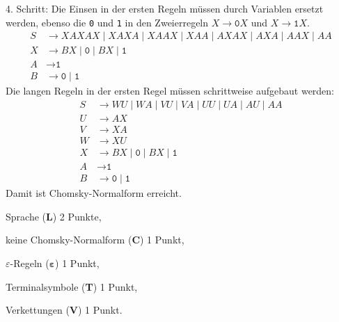 \begin{loesung}
\begin{teilaufgaben}
4. Schritt: Die Einsen in der ersten Regeln müssen durch Variablen
ersetzt werden, ebenso die \texttt{0} und \texttt{1} in den Zweierregeln
$X\to\texttt{0}X$ und $X\to\texttt{1}X$.
\begin{align*}
S & \to XAXAX \;|\; XAXA \;|\; XAAX \;|\; XAA \;|\; AXAX \;|\; AXA  \;|\; AAX \;|\; AA  
\\
X & \to
BX
\;|\;
\texttt{0}
\;|\;
BX
\;|\;
\texttt{1}
\\
A&\to \texttt{1}
\\
B&\to \texttt{0} \;|\; \texttt{1}
\end{align*}
Die langen Regeln in der ersten Regel müssen schrittweise aufgebaut werden:
\begin{align*}
S & \to WU \;|\; WA \;|\; VU \;|\; VA \;|\; UU \;|\; UA  \;|\; AU \;|\; AA  
\\
U & \to AX
\\
V & \to XA
\\
W & \to XU
\\
X & \to
BX
\;|\;
\texttt{0}
\;|\;
BX
\;|\;
\texttt{1}
\\
A&\to \texttt{1}
\\
B&\to \texttt{0} \;|\; \texttt{1}
\end{align*}
Damit ist Chomsky-Normalform erreicht.
\qedhere
\end{teilaufgaben}
\end{loesung}

\begin{bewertung}
\begin{teilaufgaben}
\item Sprache ({\bf L}) 2 Punkte,
\item keine Chomsky-Normalform ({\bf C}) 1 Punkt,
\item $\varepsilon$-Regeln ({$\mathbf{\varepsilon}$}) 1 Punkt,
\item Terminalsymbole ({\bf T}) 1 Punkt,
\item Verkettungen ({\bf V}) 1 Punkt.
\end{teilaufgaben}
\end{bewertung}
